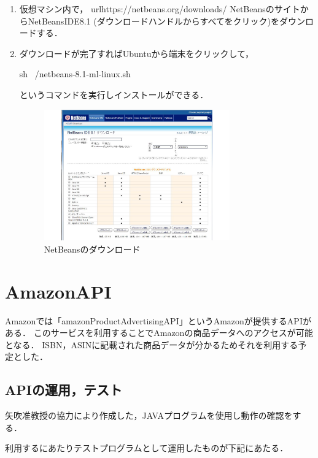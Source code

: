 \begin{enumerate}


 \item 	仮想マシン内で， url{https://netbeans.org/downloads/} NetBeansのサイトからNetBeansIDE8.1 (ダウンロードハンドルからすべてをクリック)をダウンロードする．

 \item 	ダウンロードが完了すればUbuntuから端末をクリックして，

{sh ~/netbeans-8.1-ml-linux.sh}　

というコマンドを実行しインストールができる．



\begin{figure}[htbp]

\centering
\includegraphics[width=8cm,clip]{NetBeans.pdf}
\caption{NetBeansのダウンロード}
\label{NetBeans}

\end{figure}


\end{enumerate}



\section{AmazonAPI}

Amazonでは「amazonProductAdvertisingAPI」というAmazonが提供するAPIがある．
このサービスを利用することでAmazonの商品データへのアクセスが可能となる．
ISBN，ASINに記載された商品データが分かるためそれを利用する予定とした．

\subsection{APIの運用，テスト}

矢吹准教授の協力により作成した，JAVAプログラムを使用し動作の確認をする．

利用するにあたりテストプログラムとして運用したものが下記にあたる．






